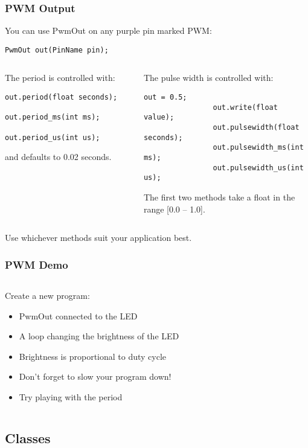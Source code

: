 \begin{frame}[fragile]
	\frametitle{PWM Output}
	You can use PwmOut on any purple pin marked PWM:
	\begin{lstlisting}[numbers=none]
		PwmOut out(PinName pin);
	\end{lstlisting}
	\vfill
	\begin{columns}[T]
		\begin{column}{0.5\textwidth}
			The period is controlled with:
			\begin{lstlisting}[numbers=none]
				out.period(float seconds);
				out.period_ms(int ms);
				out.period_us(int us);
			\end{lstlisting}
			and defaults to 0.02 seconds.
		\end{column}
		\begin{column}{0.5\textwidth}
			The pulse width is controlled with:
			\begin{lstlisting}[numbers=none]
				out = 0.5;
				out.write(float value);
				out.pulsewidth(float seconds);
				out.pulsewidth_ms(int ms);
				out.pulsewidth_us(int us);
			\end{lstlisting}
			The first two methods take a float in the range [0.0 -- 1.0].
		\end{column}
	\end{columns}
	\vfill
	Use whichever methods suit your application best.
\end{frame}

\begin{frame}[fragile]
	\frametitle{PWM Demo}
	\begin{columns}[T]
		\begin{column}{0.5\textwidth}
			Create a new program:
			\begin{itemize}
				\item PwmOut connected to the LED
				\item A loop changing the brightness of the LED
				\pause
				\item Brightness is proportional to duty cycle
				\item Don't forget to slow your program down!
				\pause
				\item Try playing with the period
			\end{itemize}
		\end{column}
		\begin{column}{0.5\textwidth}
			
		\end{column}
	\end{columns}
\end{frame}

\subsection{Classes}
\label{sub:classes}
